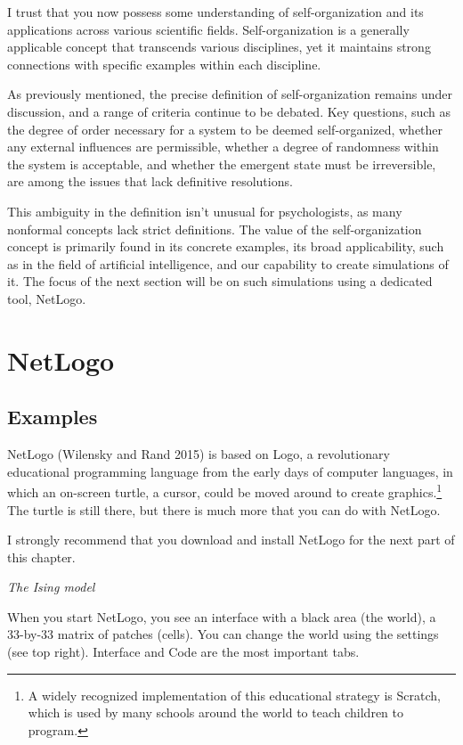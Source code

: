 \documentclass[
  a4paper,
  DIV=11,
  numbers=noendperiod,
  oneside]{scrreprt}
\begin{document}
I trust that you now possess some understanding of self-organization and
its applications across various scientific fields. Self-organization is
a generally applicable concept that transcends various disciplines, yet
it maintains strong connections with specific examples within each
discipline.

As previously mentioned, the precise definition of self-organization
remains under discussion, and a range of criteria continue to be
debated. Key questions, such as the degree of order necessary for a
system to be deemed self-organized, whether any external influences are
permissible, whether a degree of randomness within the system is
acceptable, and whether the emergent state must be irreversible, are
among the issues that lack definitive resolutions.

This ambiguity in the definition isn't unusual for psychologists, as
many nonformal concepts lack strict definitions. The value of the
self-organization concept is primarily found in its concrete examples,
its broad applicability, such as in the field of artificial
intelligence, and our capability to create simulations of it. The focus
of the next section will be on such simulations using a dedicated tool,
NetLogo.

\section{NetLogo}\label{sec-NetLogo}

\subsection{Examples}\label{sec-Examples}

NetLogo (Wilensky and Rand 2015) is based on Logo, a revolutionary
educational programming language from the early days of computer
languages, in which an on-screen turtle, a cursor, could be moved around
to create graphics.\footnote{A widely recognized implementation of this
  educational strategy is Scratch, which is used by many schools around
  the world to teach children to program.} The turtle is still there,
but there is much more that you can do with NetLogo.

I strongly recommend that you download and install NetLogo for the next
part of this chapter.

\emph{The Ising model}

When you start NetLogo, you see an interface with a black area (the
world), a 33-by-33 matrix of patches (cells). You can change the world
using the settings (see top right). Interface and Code are the most
important tabs.
\end{document}
